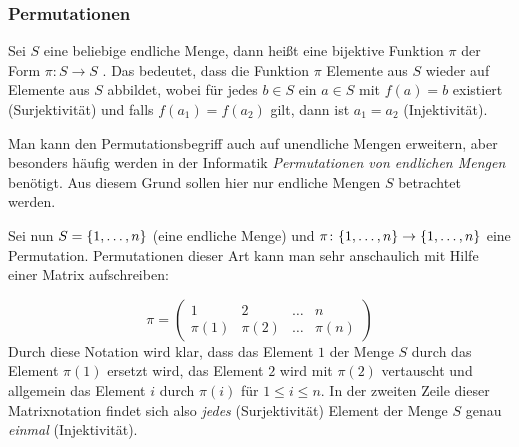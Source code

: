 \ifdiscretemath
%
%
\else

\subsubsection{Permutationen}
\label{Permutationen}
Sei $S$ eine beliebige endliche Menge, dann heißt eine bijektive Funktion $\pi$ der Form 
$\pi \colon S \rightarrow S$ \index{$\pi$}. Das bedeutet, dass die
Funktion $\pi$ Elemente aus $S$ wieder auf Elemente aus $S$ abbildet,
wobei für jedes $b \in S$ ein $a \in S$ mit $f(a) = b$ existiert
(Surjektivität) und falls $f(a_1) = f(a_2)$ gilt, dann ist $a_1 = a_2$
(Injektivität).

\begin{remark}
 Man kann den Permutationsbegriff auch auf unendliche Mengen erweitern, aber besonders häufig werden in der Informatik \emph{Permutationen von endlichen Mengen} benötigt. Aus diesem Grund sollen hier nur endliche Mengen $S$ betrachtet werden.
\end{remark}

Sei nun $S = \{1, \dots ,n\}$ (eine endliche Menge) und
$\pi \colon \{1, \dots ,n\} \rightarrow \{1, \dots ,n\}$ eine
Permutation. Permutationen dieser Art kann man sehr anschaulich mit
Hilfe einer Matrix aufschreiben:

\begin{displaymath}
\pi = \left( 
\begin{array}{cccc}
1 & 2 & \dots & n\\
\pi(1) & \pi(2) & \dots & \pi(n)
\end{array}
\right)
\end{displaymath}
Durch diese Notation wird klar, dass das Element $1$ der Menge $S$
durch das Element $\pi(1)$ ersetzt wird, das Element $2$ wird mit
$\pi(2)$ vertauscht und allgemein das Element $i$ durch $\pi(i)$ für
$1 \le i \le n$. In der zweiten Zeile dieser Matrixnotation findet
sich also \emph{jedes} (Surjektivität) Element der Menge $S$
genau \emph{einmal} (Injektivität).

